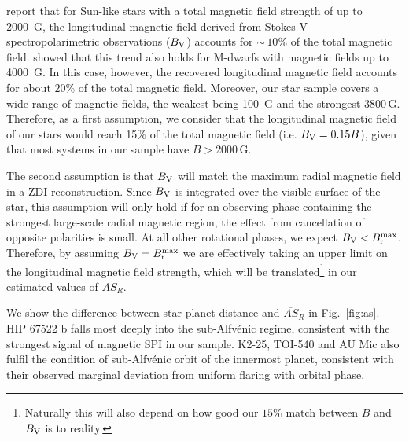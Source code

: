 \documentclass[twocolumn]{aastex631}
\begin{document}
\citet{reiners2022magnetism} report that for Sun-like stars with a total magnetic field strength of up to 2000~G, the longitudinal magnetic field derived from Stokes V spectropolarimetric observations ($B_{\rm V}$) accounts for $\sim$\,$10$\% of the total magnetic field. \cite{kochukhov2020hidden} showed that this trend also holds for M-dwarfs with magnetic fields up to 4000~G. In this case, however, the recovered longitudinal magnetic field accounts for about $20\%$ of the total magnetic field. Moreover, our star sample covers a wide range of magnetic fields, the weakest being 100~G and the strongest $3800\,$G. Therefore, as a first assumption, we consider that the longitudinal magnetic field of our stars would reach 15\% of the total magnetic field (i.e. $B_{\rm V} = 0.15B$), given that most systems in our sample have $B>2000\,$G. 

The second assumption is that $B_{\rm V}$ will match the maximum radial magnetic field in a ZDI reconstruction. Since $B_{\rm V}$ is integrated over the visible surface of the star, this assumption will only hold if for an observing phase containing the strongest large-scale radial magnetic region, the effect from cancellation of opposite polarities is small. At all other rotational phases, we expect $B_{\rm V} < B_{\rm r}^{\rm max}$. Therefore, by assuming $B_{\rm V} = B_{\rm r}^{\rm max}$ we are effectively taking an upper limit on the longitudinal magnetic field strength, which will be translated\footnote[3]{Naturally this will also depend on how good our $15$\% match between $B$ and $B_{\rm V}$ is to reality.} in our estimated values of $\overline{AS}_{R}$.

We show the difference between star-planet distance and $\overline{AS}_{R}$ in Fig.~\ref{fig:as}. HIP 67522 b falls most deeply into the sub-Alfv\'enic regime, consistent with the strongest signal of magnetic SPI in our sample. K2-25, TOI-540 and AU Mic also fulfil the condition of sub-Alfv\'enic orbit of the innermost planet, consistent with their observed marginal deviation from uniform flaring with orbital phase. 
\end{document}
